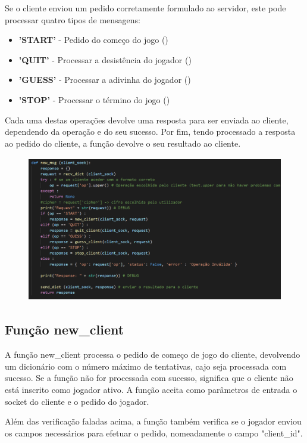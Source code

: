 \documentclass{report}
\begin{document}
Se o cliente enviou um pedido corretamente formulado ao servidor, este pode processar quatro tipos de mensagens:
\begin{itemize}
\item \textbf{'START'} - Pedido do começo do jogo ()
\item \textbf{'QUIT'} - Processar a desistência do jogador ()
\item \textbf{'GUESS'} - Processar a adivinha do jogador ()
\item \textbf{'STOP'} - Processar o término do jogo ()
\end{itemize}
Cada uma destas operações devolve uma resposta para ser enviada ao cliente, dependendo da operação e do seu sucesso. Por fim, tendo processado a resposta ao pedido do cliente, a função devolve o seu resultado ao cliente. 

\begin{figure}[!h]
\center
\includegraphics[height = 180pt]{img/newmsg.png}
\end{figure}

\subsection{Função new\_client}
\label{ssec:func_new_client}

A função new\_client processa o pedido de começo de jogo do cliente, devolvendo um dicionário com o número máximo de tentativas, cajo seja processada com sucesso. Se a função não for processada com sucesso, significa que o cliente não está inscrito como jogador ativo. A função aceita como parâmetros de entrada o socket do cliente e o pedido do jogador.

Além das verificação faladas acima, a função também verifica se o jogador enviou os campos necessários para efetuar o pedido, nomeadamente o campo "client\_id".
\end{document}
